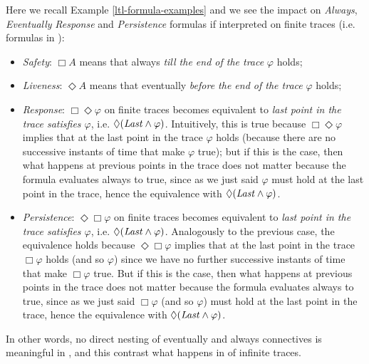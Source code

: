 \begin{example}\label{ltlf-formula-examples}
	Here we recall Example \ref{ltl-formula-examples} and we see the impact on \emph{Always}, \emph{Eventually} \emph{Response} and \emph{Persistence} \LTL formulas if interpreted on finite traces (i.e. formulas in \LTLf):
	\begin{itemize}
		\item \emph{Safety}: $\Box A$ means that always \emph{till the end of the trace} $\varphi$ holds;
		\item \emph{Liveness}: $\Diamond A$ means that eventually \emph{before the end of the trace} $\varphi$ holds;
		\item \emph{Response}: $\Box \Diamond \varphi$ on finite
		 traces becomes equivalent to \emph{last point in the trace satisfies $\varphi$}, i.e. $\Diamond(\mathit{Last} \wedge \varphi)$. Intuitively, this is true because $\Box \Diamond \varphi$ implies that at the last point in the trace $\varphi$ holds (because there are no successive instants of time that make $\varphi$ true); but if this is the case, then what happens at previous points in the trace does not matter because the formula evaluates always to true, since as we just said $\varphi$ must hold at the last point in the trace, hence the equivalence with $\Diamond(\mathit{Last} \wedge \varphi)$.
		\item \emph{Persistence}: $\Diamond \Box \varphi$ on finite traces becomes equivalent to \emph{last point in the trace satisfies $\varphi$}, i.e. $\Diamond(\mathit{Last} \wedge \varphi)$. Analogously to the previous case, the equivalence holds because $\Diamond \Box \varphi$ implies that at the last point in the trace $\Box \varphi$ holds (and so $\varphi$) since we have no further successive instants of time that make $\Box \varphi$ true. But if this is the case, then what happens at previous points in the trace does not matter because the formula evaluates always to true, since as we just said $\Box \varphi$ (and so $\varphi$) must hold at the last point in the trace, hence the equivalence with $\Diamond(\mathit{Last} \wedge \varphi)$.
	\end{itemize}
	In other words, no direct nesting of eventually and always connectives is meaningful in \LTLf, and this contrast what happens in \LTL of infinite traces.
\end{example}

